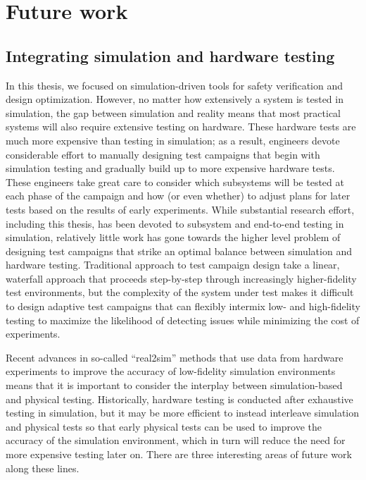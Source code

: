 \section{Future work}

\subsection{Integrating simulation and hardware testing}

In this thesis, we focused on simulation-driven tools for safety verification and design optimization. However, no matter how extensively a system is tested in simulation, the gap between simulation and reality means that most practical systems will also require extensive testing on hardware. These hardware tests are much more expensive than testing in simulation; as a result, engineers devote considerable effort to manually designing test campaigns that begin with simulation testing and gradually build up to more expensive hardware tests. These engineers take great care to consider which subsystems will be tested at each phase of the campaign and how (or even whether) to adjust plans for later tests based on the results of early experiments. While substantial research effort, including this thesis, has been devoted to subsystem and end-to-end testing in simulation, relatively little work has gone towards the higher level problem of designing test campaigns that strike an optimal balance between simulation and hardware testing. Traditional approach to test campaign design take a linear, waterfall approach that proceeds step-by-step through increasingly higher-fidelity test environments, but the complexity of the system under test makes it difficult to design adaptive test campaigns that can flexibly intermix low- and high-fidelity testing to maximize the likelihood of detecting issues while minimizing the cost of experiments.

Recent advances in so-called ``real2sim'' methods that use data from hardware experiments to improve the accuracy of low-fidelity simulation environments means that it is important to consider the interplay between simulation-based and physical testing. Historically, hardware testing is conducted after exhaustive testing in simulation, but it may be more efficient to instead interleave simulation and physical tests so that early physical tests can be used to improve the accuracy of the simulation environment, which in turn will reduce the need for more expensive testing later on. There are three interesting areas of future work along these lines.

